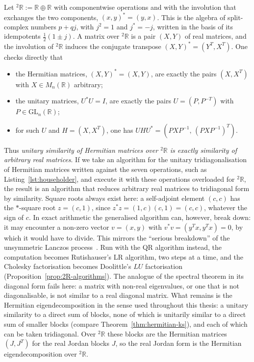 \documentclass[12pt, a4paper]{report}
\theoremstyle{plain}
\theoremstyle{definition}
\theoremstyle{remark}
\theoremstyle{plain}
\newcommand{\RR}{\mathbb{R}}
\newcommand{\GL}{\mathrm{GL}}
\newcommand{\twoR}{{}^{2}\mathbb{R}}
\begin{document}
Let $\twoR:=\RR\oplus\RR$ with componentwise operations and with the involution that exchanges the two components, $(x,y)^*=(y,x)$. This is the algebra of split-complex numbers $p+qj$, with $j^2=1$ and $j^*=-j$, written in the basis of its idempotents $\tfrac12(1\pm j)$. A matrix over $\twoR$ is a pair $(X,Y)$ of real matrices, and the involution of $\twoR$ induces the conjugate transpose $(X,Y)^*=(Y^T,X^T)$. One checks directly that
\begin{itemize}
  \item the Hermitian matrices, $(X,Y)^*=(X,Y)$, are exactly the pairs $(X,X^T)$ with $X\in M_n(\RR)$ arbitrary;
  \item the unitary matrices, $U^*U=I$, are exactly the pairs $U=(P,P^{-T})$ with $P\in\GL_n(\RR)$;
  \item for such $U$ and $H=(X,X^T)$, one has $UHU^*=(PXP^{-1},\,(PXP^{-1})^T)$.
\end{itemize}
Thus \emph{unitary similarity of Hermitian matrices over $\twoR$ is exactly similarity of arbitrary real matrices}. If we take an algorithm for the unitary tridiagonalisation of Hermitian matrices written against the seven operations, such as Listing~\ref{lst:householder}, and execute it with these operations overloaded for $\twoR$, the result is an algorithm that reduces arbitrary real matrices to tridiagonal form by similarity. Square roots always exist here: a self-adjoint element $(c,c)$ has the $*$-square root $z=(c,1)$, since $z^*z=(1,c)(c,1)=(c,c)$, whatever the sign of $c$. In exact arithmetic the generalised algorithm can, however, break down: it may encounter a non-zero vector $v=(x,y)$ with $v^*v=(y^Tx,y^Tx)=0$, by which it would have to divide. This mirrors the ``serious breakdown'' of the unsymmetric Lanczos process~\cite{GolubVanLoan2013}. Run with the QR algorithm instead, the computation becomes Rutishauser's LR algorithm, two steps at a time, and the Cholesky factorisation becomes Doolittle's $LU$ factorisation (Proposition~\ref{prop:2R-algorithms}). The analogue of the spectral theorem in its diagonal form fails here: a matrix with non-real eigenvalues, or one that is not diagonalisable, is not similar to a real diagonal matrix. What remains is the Hermitian eigendecomposition in the sense used throughout this thesis: a unitary similarity to a direct sum of blocks, none of which is unitarily similar to a direct sum of smaller blocks (compare Theorem~\ref{thm:hermitian-ks}), and each of which can be taken tridiagonal. Over $\twoR$ these blocks are the Hermitian matrices $(J,J^T)$ for the real Jordan blocks $J$, so the real Jordan form is the Hermitian eigendecomposition over $\twoR$.
\end{document}
